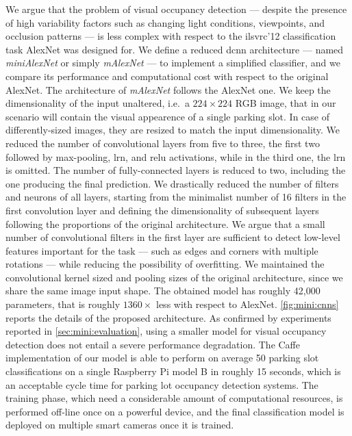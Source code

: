 We argue that the problem of visual occupancy detection --- despite the presence of high variability factors such as changing light conditions, viewpoints, and occlusion patterns --- is less complex with respect to the \gls{ilsvrc}'12 classification task AlexNet was designed for.
We define a reduced \gls{dcnn} architecture --- named \emph{miniAlexNet} or simply \emph{mAlexNet} --- to implement a simplified classifier, and we compare its performance and computational cost with respect to the original AlexNet.
The architecture of \emph{mAlexNet} follows the AlexNet one.
We keep the dimensionality of the input unaltered, i.e.\ a $224 \times 224$ RGB image, that in our scenario will contain the visual appearence of a single parking slot.
In case of differently-sized images, they are resized to match the input dimensionality.
We reduced the number of convolutional layers from five to three, the first two followed by max-pooling, \gls{lrn}, and \gls{relu} activations, while in the third one, the \gls{lrn} is omitted.
The number of fully-connected layers is reduced to two, including the one producing the final prediction.
We drastically reduced the number of filters and neurons of all layers, starting from the minimalist number of 16 filters in the first convolution layer and defining the dimensionality of subsequent layers following the proportions of the original architecture.
We argue that a small number of convolutional filters in the first layer are sufficient to detect low-level features important for the task --- such as edges and corners with multiple rotations --- while reducing the possibility of overfitting.
We maintained the convolutional kernel sized and pooling sizes of the original architecture, since we share the same image input shape.
The obtained model has roughly 42,000 parameters, that is roughly $1360 \times$ less with respect to AlexNet.
\ref{fig:mini:cnns} reports the details of the proposed architecture.
As confirmed by experiments reported in \ref{sec:mini:evaluation}, using a smaller model for visual occupancy detection does not entail a severe performance degradation.
The Caffe implementation of our model is able to perform on average 50 parking slot classifications on a single Raspberry Pi model B in roughly 15 seconds, which is an acceptable cycle time for parking lot occupancy detection systems. %
The training phase, which need a considerable amount of computational resources, is performed off-line once on a powerful device, and the final classification model is deployed on multiple smart cameras once it is trained.

